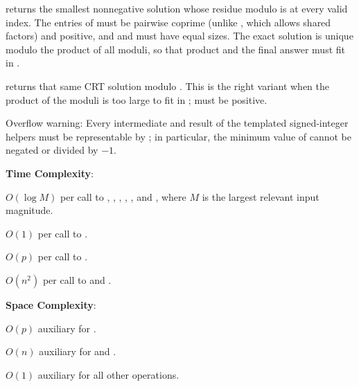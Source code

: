 \begin{compactitem}
  \item {} returns the smallest nonnegative solution whose residue modulo  is  at every valid index. The entries of  must be pairwise coprime (unlike , which allows shared factors) and positive, and  and  must have equal sizes. The exact solution is unique modulo the product of all moduli, so that product and the final answer must fit in .
  \item {} returns that same CRT solution modulo . This is the right variant when the product of the moduli is too large to fit in ;  must be positive.
\end{compactitem}

Overflow warning: Every intermediate and result of the templated signed-integer helpers must be representable by ; in particular, the minimum value of  cannot be negated or divided by $-1$.

\textbf{Time Complexity}:
\begin{compactitem}
  \item $O(\log M)$ per call to , , , , , and , where $M$ is the largest relevant input magnitude.
  \item $O(1)$ per call to .
  \item $O(p)$ per call to .
  \item $O(n^{2})$ per call to  and .
\end{compactitem}

\textbf{Space Complexity}:
\begin{compactitem}
  \item $O(p)$ auxiliary for .
  \item $O(n)$ auxiliary for  and .
  \item $O(1)$ auxiliary for all other operations.
\end{compactitem}

